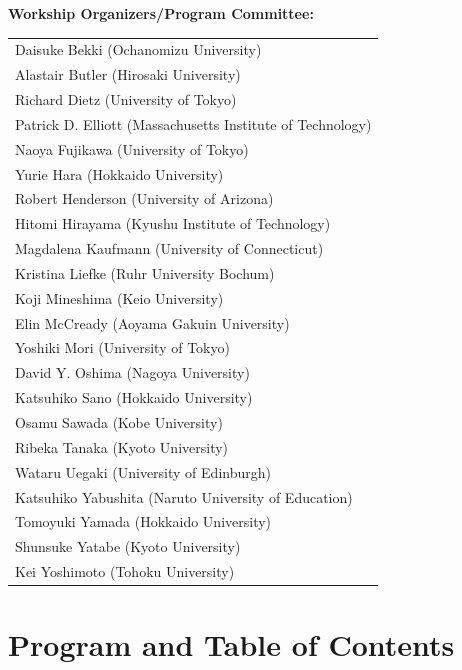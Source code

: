 \documentclass[12pt]{jarticle}
\begin{document}
\begin{center}
{\large \textbf{Workship Organizers/Program Committee:}} \\
\vspace*{1cm}
\begin{tabular}{l}
Daisuke Bekki (Ochanomizu University) \\
Alastair Butler (Hirosaki University) \\
Richard Dietz (University of Tokyo) \\
Patrick D. Elliott (Massachusetts Institute of Technology) \\
Naoya Fujikawa (University of Tokyo) \\
Yurie Hara (Hokkaido University) \\
Robert Henderson (University of Arizona) \\
Hitomi Hirayama (Kyushu Institute of Technology) \\
Magdalena Kaufmann (University of Connecticut) \\
Kristina Liefke (Ruhr University Bochum) \\
Koji Mineshima (Keio University) \\
Elin McCready (Aoyama Gakuin University) \\
Yoshiki Mori (University of Tokyo) \\
David Y. Oshima (Nagoya University) \\
Katsuhiko Sano (Hokkaido University) \\
Osamu Sawada (Kobe University) \\
Ribeka Tanaka (Kyoto University) \\
Wataru Uegaki (University of Edinburgh) \\
Katsuhiko Yabushita (Naruto University of Education) \\
Tomoyuki Yamada (Hokkaido University) \\
Shunsuke Yatabe (Kyoto University) \\
Kei Yoshimoto (Tohoku University) \\

\end{tabular}
\end{center}
\newpage
  
\section*{Program and Table of Contents}

\newcommand{\slot}[2]{\noindent \underline{#1 \  #2} \\}
\newcommand{\talk}[3]{
  \noindent #2 \\ 
  \indent\indent \textit{#1} \dotfill #3 
  \smallskip \\
  }
\newcommand{\talkk}[3]{
  \noindent #2 \\ 
  \indent\indent \textit{#1}
  \smallskip \\
  }
\end{document}
